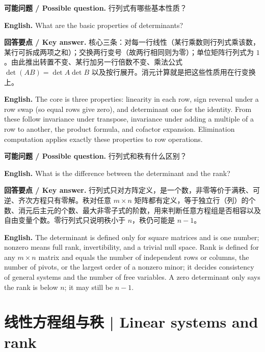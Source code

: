 \documentclass[UTF8,11pt,a4paper]{ctexart}
\newcommand{\EN}[1]{\par\noindent\textbf{English.} #1\par}
\newcommand{\ASK}[4]{\par\noindent\textbf{可能问题 / Possible question.} #1\par\EN{#2}\noindent\textbf{回答要点 / Key answer.} #3\par\EN{#4}\medskip}
\begin{document}
\ASK{行列式有哪些基本性质？}{What are the basic properties of determinants?}{核心三条：对每一行线性（某行乘数则行列式乘该数，某行可拆成两项之和）；交换两行变号（故两行相同则为零）；单位矩阵行列式为 $1$。由此推出转置不变、某行加另一行倍数不变、乘法公式 $\det(AB)=\det A\det B$ 以及按行展开。消元计算就是把这些性质用在行变换上。}{The core is three properties: linearity in each row, sign reversal under a row swap (so equal rows give zero), and determinant one for the identity. From these follow invariance under transpose, invariance under adding a multiple of a row to another, the product formula, and cofactor expansion. Elimination computation applies exactly these properties to row operations.}
\ASK{行列式和秩有什么区别？}{What is the difference between the determinant and the rank?}{行列式只对方阵定义，是一个数，非零等价于满秩、可逆、齐次方程只有零解。秩对任意 $m\times n$ 矩阵都有定义，等于独立行（列）的个数、消元后主元的个数、最大非零子式的阶数，用来判断任意方程组是否相容以及自由变量个数。零行列式只说明秩小于 $n$，秩仍可能是 $n-1$。}{The determinant is defined only for square matrices and is one number; nonzero means full rank, invertibility, and a trivial null space. Rank is defined for any $m\times n$ matrix and equals the number of independent rows or columns, the number of pivots, or the largest order of a nonzero minor; it decides consistency of general systems and the number of free variables. A zero determinant only says the rank is below $n$; it may still be $n-1$.}

\section{线性方程组与秩 | Linear systems and rank}
\end{document}
